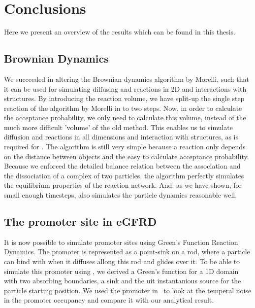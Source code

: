 \section{Conclusions}

Here we present an overview of the results which can be found in this thesis.

\subsection{Brownian Dynamics}
We succeeded in altering the Brownian dynamics algorithm by Morelli, such that it can be used for simulating diffusing and reactions in 2D and interactions with structures. By introducing the reaction volume, we have split-up the single step reaction of the algorithm by Morelli in to two steps. Now, in order to calculate the acceptance probability, we only need to calculate this volume, instead of the much more difficult 'volume' of the old method. This enables us to simulate diffusion and reactions in all dimensions and interaction with structures, as is required for \GFRD. The algorithm is still very simple because a reaction only depends on the distance between objects and the easy to calculate acceptance probability. 
Because we enforced the detailed balance relation between the association and the dissociation of a complex of two particles, the algorithm perfectly simulates the equilibrium properties of the reaction network. And, as we have shown, for small enough timesteps, also simulates the particle dynamics reasonable well. 

\subsection{The promoter site in eGFRD}
It is now possible to simulate promoter sites using Green's Function Reaction Dynamics. The promoter is represented as a point-sink on a rod, where a particle can bind with when it diffuses allong this rod and glides over it. To be able to simulate this promoter using \GFRD, we derived a Green's function for a 1D domain with two absorbing boundaries, a sink and the uit instantanious source for the particle starting position. We used the promoter in \GFRD\, to look at the temperal noise in the promoter occupancy and compare it with our analytical result. 

